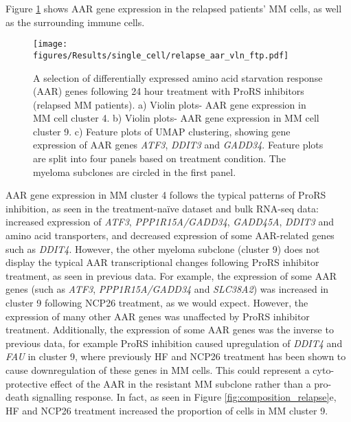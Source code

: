 Figure \ref{fig:relapse_aar_vln_ftp} shows AAR gene expression in the relapsed patients' MM cells, as well as the surrounding immune cells.
%
\begin{figure}[htb]
\centering
\texttt{[image: figures/Results/single\_cell/relapse\_aar\_vln\_ftp.pdf]}
\caption[Differentially expressed AAR genes- relapsed MM]{A selection of differentially expressed amino acid starvation response (AAR) genes following 24 hour treatment with ProRS inhibitors (relapsed MM patients).
    a) Violin plots- AAR gene expression in MM cell cluster 4.
    b) Violin plots- AAR gene expression in MM cell cluster 9.
    c) Feature plots of UMAP clustering, showing gene expression of AAR genes \textit{ATF3}, \textit{DDIT3} and \textit{GADD34}.
Feature plots are split into four panels based on treatment condition.
The myeloma subclones are circled in the first panel.
}
\label{fig:relapse_aar_vln_ftp}
\end{figure}
AAR gene expression in MM cluster 4 follows the typical patterns of ProRS inhibition, as seen in the treatment-na\"ive dataset and bulk RNA-seq data: increased expression of \textit{ATF3}, \textit{PPP1R15A/GADD34}, \textit{GADD45A}, \textit{DDIT3} and amino acid transporters, and decreased expression of some AAR-related genes such as \textit{DDIT4}.
However, the other myeloma subclone (cluster 9) does not display the typical AAR transcriptional changes following ProRS inhibitor treatment, as seen in previous data.
For example, the expression of some AAR genes (such as \textit{ATF3}, \textit{PPP1R15A/GADD34} and \textit{SLC38A2}) was increased in cluster 9 following NCP26 treatment, as we would expect.
However, the expression of many other AAR genes was unaffected by ProRS inhibitor treatment.
Additionally, the expression of some AAR genes was the inverse to previous data, for example ProRS inhibition caused upregulation of \textit{DDIT4} and \textit{FAU} in cluster 9, where previously HF and NCP26 treatment has been shown to cause downregulation of these genes in MM cells.
This could represent a cyto-protective effect of the AAR in the resistant MM subclone rather than a pro-death signalling response.
In fact, as seen in Figure \ref{fig:composition_relapse}e, HF and NCP26 treatment increased the proportion of cells in MM cluster 9.

